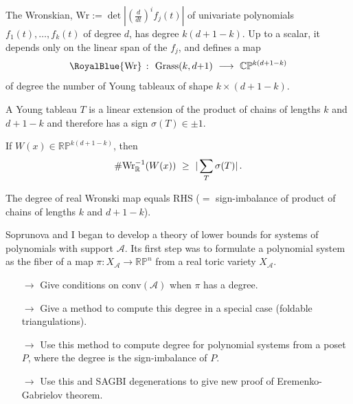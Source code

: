 \documentclass[17pt,landscape]{Narrow}
\newcommand{\DeCo}{\RoyalBlue}
\renewcommand{\P}{{\mathbb P}}
\newcommand{\C}{{\mathbb C}}
\newcommand{\R}{{\mathbb R}}
\newcommand{\calA}{{\mathcal A}}
\begin{document}
\begin{flushleft}
The  Wronskian, $\mbox{Wr}:=\det|(\frac{d}{d t})^i f_j(t)|$ of
univariate polynomials $f_1(t),\dotsc,f_k(t)$ of degree $d$, has degree $k(d{+}1{-}k)$.
Up to a scalar, it depends only on the linear span of the $f_j$, and 
defines a map\vspace{-8pt}
\[
   \DeCo{\mbox{Wr}}\ \colon\ \mbox{Grass}(k,d{+}1) \ \longrightarrow\ \C\P^{k(d+1-k)}\vspace{-8pt}
\]
of degree the number of Young tableaux of shape $k\times(d{+}1{-}k)$.

A Young tableau $T$ is a linear extension of the product of chains of lengths $k$
and $d{+}1{-}k$ and therefore has a sign $\sigma(T)\in{\pm1}$.


If $W(x)\in\R\P^{k(d+1-k)}$, then \vspace{-8pt}
\[
   \# \mbox{Wr}_\R^{-1}(W(x))\ \geq\  |\sum_T \sigma(T)|\,.\vspace{-18pt}
\]

 The degree of real Wronski map equals RHS \newline ($=$ sign-imbalance of product of
chains of lengths $k$ and $d{+}1{-}k$). 
\slide{}
\LogoOn
\begin{center}
\end{center}

Soprunova and I began to develop a theory of lower bounds for systems of polynomials with
support $\calA$.  
Its first step was to formulate a polynomial system as the fiber of a map 
$\pi\colon X_\calA\to\R\P^n$ from a real toric variety $X_\calA$.\vspace{-4pt}

\begin{itemize}
 \item[$\to$] Give conditions on $\mbox{conv}(\calA)$ when $\pi$ has a degree.
 \item[$\to$] Give a method to compute this degree in a special case (foldable triangulations).
 \item[$\to$] Use this method to compute degree for polynomial systems from a poset $P$,
              where the degree is the sign-imbalance of $P$.
 \item[$\to$] Use this and SAGBI degenerations to give new proof of Eremenko-Gabrielov
              theorem.\vspace{-4pt} 
\end{itemize}


\end{flushleft}
\end{document}
